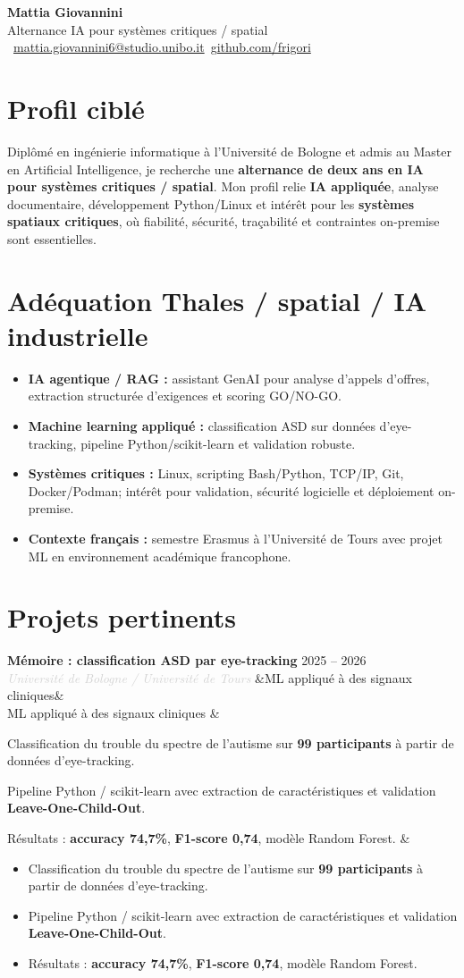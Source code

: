\documentclass[a4paper,10pt]{article}
\newcommand{\entrylist}[5]{%
  \noindent\textbf{#1} \hfill \textcolor{accent}{#2}\\
  \textit{\textcolor{lightgray}{#3}}%
  \ifx&#4&\else\\[-0.05em]#4\fi
  \vspace{0.15em}
  \ifx&#5&\else\begin{itemize}#5\end{itemize}\fi
  \vspace{0.1em}
}
\begin{document}
\begin{center}
  {\Huge\bfseries\color{darkgray} Mattia Giovannini}\\[0.3em]
  {\large\color{accent} Alternance IA pour systèmes critiques / spatial}\\[0.45em]
  \textcolor{lightgray}{\faEnvelope\ \href{mailto:mattia.giovannini6@studio.unibo.it}{mattia.giovannini6@studio.unibo.it}\quad\textbullet\quad\faGithub\ \href{https://github.com/frigori}{github.com/frigori}}
\end{center}

\section{Profil ciblé}
Diplômé en ingénierie informatique à l'Université de Bologne et admis au Master en Artificial Intelligence, je recherche une \textbf{alternance de deux ans en IA pour systèmes critiques / spatial}. Mon profil relie \textbf{IA appliquée}, analyse documentaire, développement Python/Linux et intérêt pour les \textbf{systèmes spatiaux critiques}, où fiabilité, sécurité, traçabilité et contraintes on-premise sont essentielles.

\section{Adéquation Thales / spatial / IA industrielle}
\begin{itemize}
  \item \textbf{IA agentique / RAG :} assistant GenAI pour analyse d'appels d'offres, extraction structurée d'exigences et scoring GO/NO-GO.
  \item \textbf{Machine learning appliqué :} classification ASD sur données d'eye-tracking, pipeline Python/scikit-learn et validation robuste.
  \item \textbf{Systèmes critiques :} Linux, scripting Bash/Python, TCP/IP, Git, Docker/Podman; intérêt pour validation, sécurité logicielle et déploiement on-premise.
  \item \textbf{Contexte français :} semestre Erasmus à l'Université de Tours avec projet ML en environnement académique francophone.
\end{itemize}

\section{Projets pertinents}

\entrylist{Mémoire : classification ASD par eye-tracking}{2025 -- 2026}{Université de Bologne / Université de Tours}{ML appliqué à des signaux cliniques}{
  \item Classification du trouble du spectre de l'autisme sur \textbf{99 participants} à partir de données d'eye-tracking.
  \item Pipeline Python / scikit-learn avec extraction de caractéristiques et validation \textbf{Leave-One-Child-Out}.
  \item Résultats : \textbf{accuracy 74,7\%}, \textbf{F1-score 0,74}, modèle Random Forest.
}
\end{document}

